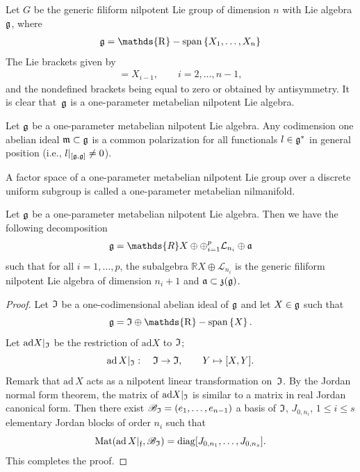 \documentclass[pdftex]{sigma}
\newcommand{\set}[1]{\left\{#1\right\}}
\DeclareMathOperator{\spann}{\mathds{R}-span}
\begin{document}
 \begin{example}
  Let $G$ be the generic f\/iliform
nilpotent Lie group of dimension $n$ with Lie algebra $\frak g$,
where
\begin{gather*}
 \frak g = \spann\set{X_1,
\ldots, X_n}
\end{gather*}
The Lie brackets  given by
\begin{gather*}
[X_n, X_i] = X_{i-1},  \qquad i=2,\ldots,  n-1,
\end{gather*}
and the nondef\/ined brackets being equal to zero or obtained by
antisymmetry. It is clear that~$\frak g$ is a one-parameter
metabelian nilpotent Lie algebra.
\end{example}

\begin{remark} Let $\frak g$ be a one-parameter metabelian
 nilpotent Lie algebra. Any
codimension one abelian ideal $\frak m\subset \frak g$ is a common
polarization for all functionals $l\in \frak g^*$ in general
position (i.e.,  $l\vert_{[\frak g, \frak g]}\ne 0$).
\end{remark}


\begin{definition}\sloppy
A factor space of a one-parameter met\-abe\-lian nilpotent Lie group
over a discrete uniform subgroup is called a one-parameter
metabelian nilmanifold.
\end{definition}


\begin{proposition}\label{decomposition-speciale} Let $\frak g$ be a
one-parameter metabelian nilpotent Lie algebra. Then we have the
following decomposition
\begin{gather*}
\frak g = \mathds{R} X \oplus \oplus_{i=1}^p \mathcal{L}_{n_i}
\oplus \frak a
\end{gather*}
such that for all $i=1,\ldots, p$, the subalgebra $\mathds{R} X
\oplus  \mathcal{L}_{n_i} $ is the generic filiform nilpotent Lie
algebra of dimension $n_i+1$ and $\frak a \subset \frak z(\frak g)$.
 \end{proposition}

 \begin{proof} Let $\frak I$ be a one-codimensional abelian ideal of
 $\frak  g$ and let $X\in \frak g$ such that
\[
\frak g= \frak I\oplus \spann\set{X}.
\]
 Let $\mathrm{ad} X\vert_{\frak I}$ be the
 restriction of $\mathrm{ad}
 X$ to $\frak I$;
\[
\mathrm{ad}\, X\vert_{\frak I}: \quad \frak I\rightarrow \frak I,\qquad
 Y\mapsto [X, Y].
 \]
 Remark that $\mathrm{ad}\, X$ acts as a nilpotent linear
 transformation on~$\frak I$.
 By the Jordan normal form theorem, the matrix of
 $\mathrm{ad} X\vert_{\frak I}$ is similar to a matrix in real Jordan canonical form. Then
 there exist $\mathscr{B}_{\frak I}=(e_1, \ldots, e_{n-1})$  a
 basis of $\frak I$, $J_{0, n_i}$, $1\leq i\leq s$  elementary Jordan
 blocks of order $n_i$ such that
\[
\mathrm{Mat}(\mathrm{ad}\, X\vert_{\frak
 f}, \mathscr{B}_{\frak I}) =
  \mathrm{diag}[J_{0, n_1}, \ldots, J_{0, n_s}].
\]
  This completes the proof.
 \end{proof}
\end{document}
